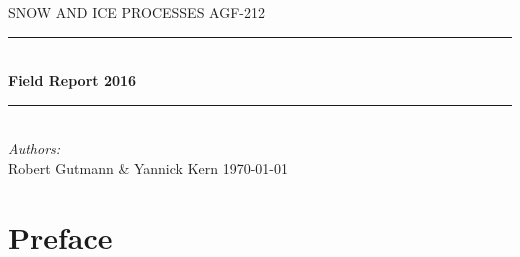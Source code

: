 \documentclass[12pt,a4paper,titlepage = false,twoside, bibliography=totoc]{scrreprt}
\newcommand{\chapterauthor}{}
\begin{document}
	
	
\begin{titlepage}
	\begin{center}
		\textsf{\MakeUppercase \huge SNOW AND ICE PROCESSES AGF-212}\\[0.5cm]
		\newcommand{\HRule}{\rule{\linewidth}{0.5mm}}
		\HRule \\[0.4cm]
		{ \huge \bfseries Field Report 2016}\\[0.4cm]
		\HRule \\[1.5cm]
		
		\vfill
		{\large
			\emph{Authors:}\\
			Robert Gutmann \& Yannick Kern}
		\vfill
		{\large \today}
	\end{center}
\end{titlepage}

\setcounter{tocdepth}{2}
\tableofcontents


\clearpage


\chapter*{Preface}

\clearpage


\graphicspath{{student01/figs/}}


%




\begin{appendices}
\renewcommand{\chapterauthor}{}

\graphicspath{{student01/figs/}} 	


%


\end{appendices}
\end{document}
